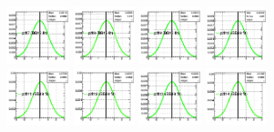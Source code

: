 \begin{spacing}{2}
\begin{figure}[!htbp]
{{\includegraphics[width=0.16\textwidth]{fig/posteriors__pdf7_BB18_fitBBBE161718_ADDGRW.png}
\includegraphics[width=0.16\textwidth]{fig/posteriors__pdf8_BB18_fitBBBE161718_ADDGRW.png}
\includegraphics[width=0.16\textwidth]{fig/posteriors__pdf9_BB18_fitBBBE161718_ADDGRW.png}
\includegraphics[width=0.16\textwidth]{fig/posteriors__pdf10_BB18_fitBBBE161718_ADDGRW.png}\\
\includegraphics[width=0.16\textwidth]{fig/posteriors__pdf11_BB18_fitBBBE161718_ADDGRW.png}
\includegraphics[width=0.16\textwidth]{fig/posteriors__pdf12_BB18_fitBBBE161718_ADDGRW.png}
\includegraphics[width=0.16\textwidth]{fig/posteriors__pdf13_BB18_fitBBBE161718_ADDGRW.png}
\includegraphics[width=0.16\textwidth]{fig/posteriors__pdf14_BB18_fitBBBE161718_ADDGRW.png}
}}
\end{figure}
\end{spacing}
